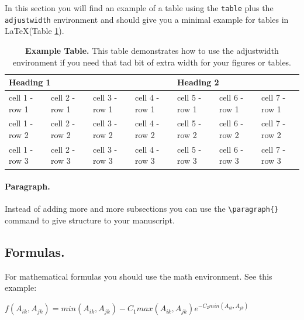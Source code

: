 \documentclass[10pt,letterpaper]{article}
\begin{document}
In this section you will find an example of a table using the \verb!table! plus the \verb!adjustwidth! environment and should give you a minimal example for tables in \LaTeX (Table \ref{tab1}).

\begin{table}[!ht]
\begin{adjustwidth}{-1.5in}{0in} %
\centering
\caption{{\bf Example Table.} This table demonstrates how to use the  adjustwidth environment if you need that tad bit of extra width for your figures or tables.}
\begin{tabular}{|l|l|l|l|l|l|l|}
\hline
\multicolumn{4}{|l|}{\bf Heading 1} & \multicolumn{3}{|l|}{\bf Heading 2}\\ \hline
cell 1 - row 1 & cell 2 - row 1 & cell 3 - row 1 & cell 4 - row 1 & cell 5 - row 1 & cell 6 - row 1 & cell 7 - row 1 \\ \hline
cell 1 - row 2 & cell 2 - row 2 & cell 3 - row 2 & cell 4 - row 2 & cell 5 - row 2 & cell 6 - row 2 & cell 7 - row 2 \\ \hline
cell 1 - row 3 & cell 2 - row 3 & cell 3 - row 3 & cell 4 - row 3 & cell 5 - row 3 & cell 6 - row 3 & cell 7 - row 3 \\ \hline
\end{tabular}
\label{tab1}
\end{adjustwidth}
\end{table}

\paragraph{Paragraph.}
Instead of adding more and more subsections you can use the \verb!\paragraph{}! command to give structure to your manuscript.

\subsection*{Formulas.}
For mathematical formulas you should use the math environment. See this example:

\begin{center}
$f(A_{ik},A_{jk}) = min(A_{ik},A_{jk}) - C_{1} max(A_{ik},A_{jk}) e^{-C_{2}min(A_{ik},A_{jk})}$
\end{center}

\newpage
\end{document}
